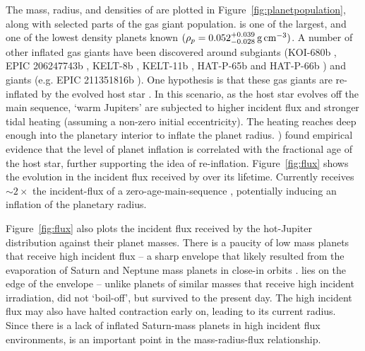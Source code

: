 \documentclass[apjl]{emulateapj}
\newcommand{\gcmc}{\ensuremath{\rm g\,cm^{-3}}}
\newcommand{\logg}{\ensuremath{\log{g}}}
\newcommand{\rhopl}{\ensuremath{\rho_{p}}}
\newcommand{\genevaplrho}{\ensuremath{0.052_{-0.028}^{+0.039}}}         %
\begin{document}
The mass, radius, and densities of \hatcurb{} are plotted in Figure~\ref{fig:planetpopulation}, along with selected parts of the gas giant population. \hatcurb{} is one of the largest, and one of the lowest density planets known $(\rhopl = \genevaplrho \, \gcmc)$. A number of other inflated gas giants have been discovered around subgiants (KOI-680b \citealt{2015A&A...575A..71A}, EPIC 206247743b \citealt{2016arXiv160509180V}, KELT-8b \citealt{2015ApJ...810...30F}, KELT-11b \citealt{2016arXiv160701755P}, HAT-P-65b and HAT-P-66b \citealt{2016arXiv160902767H}) and giants (e.g. EPIC 211351816b \citealt{Grunblatt:2016}). One hypothesis is that these gas giants are re-inflated by the evolved host star \citep{2016ApJ...818....4L}. In this scenario, as the host star evolves off the main sequence, `warm Jupiters' are subjected to higher incident flux and stronger tidal heating (assuming a non-zero initial eccentricity). The heating reaches deep enough into the planetary interior to inflate the planet radius. \citet{2016arXiv160902767H}) found empirical evidence that the level of planet inflation is correlated with the fractional age of the host star, further supporting the idea of re-inflation. Figure~\ref{fig:flux} shows the evolution in the incident flux received by \hatcurb{} over its lifetime. Currently \hatcurb{} receives $\sim 2\times$ the incident-flux of a zero-age-main-sequence \hatcur{}, potentially inducing an inflation of the planetary radius.

\begin{figure*}[!ht]
\caption{
The mass--radius and mass--density distributions of known transiting exoplanets are plotted. The colors of the points represent the equilibrium temperatures of the planets, while their sizes are scaled to indicate the radii of the host stars. Planets that orbit evolved stars ($\logg < 4.0$) are marked by the open grey circles. \hatcurb{} is labelled, and its $1\sigma$ uncertainties are shown by the error bars. We note that it is one of the largest radius, lowest density planets found to date. 
\label{fig:planetpopulation}}
\end{figure*}

Figure~\ref{fig:flux} also plots the incident flux received by the hot-Jupiter distribution against their planet masses. There is a paucity of low mass planets that receive high incident flux -- a sharp envelope that likely resulted from the evaporation of Saturn and Neptune mass planets in close-in orbits \citep[e.g.][]{2007A&A...461.1185L,2011A&A...529A.136E,2013ApJ...775..105O}. \hatcurb{} lies on the edge of the envelope -- unlike planets of similar masses that receive high incident irradiation, \hatcurb{} did not `boil-off', but survived to the present day. The high incident flux may also have halted contraction early on, leading to its current radius. Since there is a lack of inflated Saturn-mass planets in high incident flux environments, \hatcurb{} is an important point in the mass-radius-flux relationship. 
\end{document}
